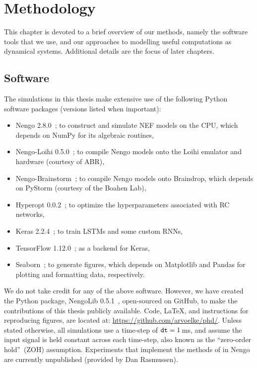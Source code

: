 \chapter{Methodology}
\label{chapt:methodology}

This chapter is devoted to a brief overview of our methods, namely the software tools that we use, and our approaches to modelling useful computations as dynamical systems.
Additional details are the focus of later chapters.

\section{Software}
\label{sec:software}

The simulations in this thesis make extensive use of the following Python software packages (versions listed when important):
\begin{itemize}
\item Nengo 2.8.0~\citep{bekolay2014}; to construct and simulate NEF models on the CPU, which depends on NumPy for its algebraic routines,
\item Nengo-Loihi 0.5.0~\citep{blouw2018a, nengoloihi}; to compile Nengo models onto the Loihi emulator and hardware (courtesy of ABR),
\item Nengo-Brainstorm~\citep[pre-release;][courtesy of Terry Stewart]{neckar2018optimizing, braindrop2019}; to compile Nengo models onto Braindrop, which depends on PyStorm (courtesy of the Boahen Lab),
\item Hyperopt 0.0.2~\citep{bergstra2015hyperopt}; to optimize the hyperparameters associated with RC networks,
\item Keras 2.2.4~\citep{gulli2017deep}; to train LSTMs and some custom RNNs,
\item TensorFlow 1.12.0~\citep{abadi2016tensorflow}; as a backend for Keras,
\item Seaborn~\citep{michael_waskom_2015_19108}; to generate figures, which depends on Matplotlib and Pandas for plotting and formatting data, respectively.
\end{itemize}
We do not take credit for any of the above software.
However, we have created the Python package, NengoLib 0.5.1~\citep[][patent~pending]{dynamicspatent, nengolib, thesispatent}, open-sourced on GitHub, to make the contributions of this thesis publicly available.
Code, \LaTeX{}, and instructions for reproducing figures, are located at: \url{https://github.com/arvoelke/phd/}.
Unless stated otherwise, all simulations use a time-step of $\texttt{dt}{} = 1$\,ms, and assume the input signal is held constant across each time-step, also known as the ``zero-order hold''~(ZOH) assumption.
Experiments that implement the methods of \citet{boerlin2013predictive} in Nengo are currently unpublished (provided by Dan Rasmussen).

